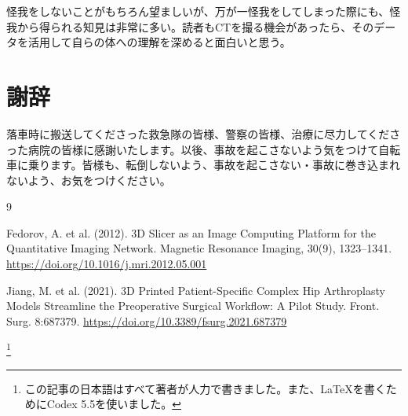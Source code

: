 \documentclass[10pt,a4paper,twocolumn]{ltjsarticle}
\newcommand{\blfootnote}[1]{%
  \begingroup
  \renewcommand\thefootnote{}%
  \footnote{#1}%
  \addtocounter{footnote}{-1}%
  \endgroup
}
\begin{document}
怪我をしないことがもちろん望ましいが、万が一怪我をしてしまった際にも、怪我から得られる知見は非常に多い。読者もCTを撮る機会があったら、そのデータを活用して自らの体への理解を深めると面白いと思う。








\section*{謝辞}

落車時に搬送してくださった救急隊の皆様、警察の皆様、治療に尽力してくださった病院の皆様に感謝いたします。以後、事故を起こさないよう気をつけて自転車に乗ります。皆様も、転倒しないよう、事故を起こさない・事故に巻き込まれないよう、お気をつけください。

\begin{thebibliography}{9}

Fedorov, A. et al. (2012). 3D Slicer as an Image Computing Platform for the Quantitative Imaging Network. Magnetic Resonance Imaging, 30(9), 1323–1341. \url{https://doi.org/10.1016/j.mri.2012.05.001}

Jiang, M. et al. (2021). 3D Printed Patient-Specific Complex Hip Arthroplasty Models Streamline the Preoperative Surgical Workflow: A Pilot Study. Front. Surg. 8:687379. \url{https://doi.org/10.3389/fsurg.2021.687379}

\end{thebibliography}

\blfootnote{この記事の日本語はすべて著者が人力で書きました。また、LaTeXを書くためにCodex 5.5を使いました。}
\end{document}
